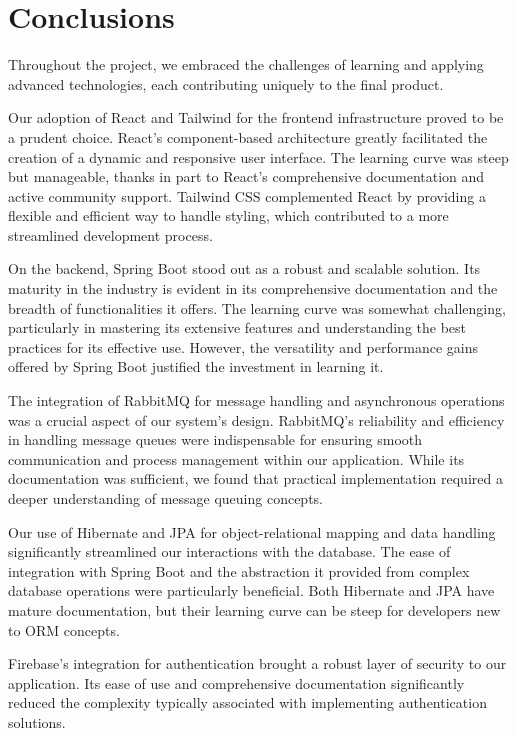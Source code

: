 \section{Conclusions}
\label{sec:conclusion}

Throughout the project, we embraced the challenges of learning and applying advanced technologies, each contributing uniquely to the final product.

Our adoption of React and Tailwind for the frontend infrastructure proved to be a prudent choice. React's component-based architecture greatly facilitated the creation of a dynamic and responsive user interface. The learning curve was steep but manageable, thanks in part to React's comprehensive documentation and active community support. Tailwind CSS complemented React by providing a flexible and efficient way to handle styling, which contributed to a more streamlined development process.

On the backend, Spring Boot \cite{springboot2023} stood out as a robust and scalable solution. Its maturity in the industry is evident in its comprehensive documentation and the breadth of functionalities it offers. The learning curve was somewhat challenging, particularly in mastering its extensive features and understanding the best practices for its effective use. However, the versatility and performance gains offered by Spring Boot justified the investment in learning it.

The integration of RabbitMQ \cite{rabbitmq2023} for message handling and asynchronous operations was a crucial aspect of our system's design. RabbitMQ's reliability and efficiency in handling message queues were indispensable for ensuring smooth communication and process management within our application. While its documentation was sufficient, we found that practical implementation required a deeper understanding of message queuing concepts.

Our use of Hibernate \cite{hibernate2023} and JPA for object-relational mapping and data handling significantly streamlined our interactions with the database. The ease of integration with Spring Boot and the abstraction it provided from complex database operations were particularly beneficial. Both Hibernate and JPA have mature documentation, but their learning curve can be steep for developers new to ORM concepts.

Firebase's \cite{firebase2023} integration for authentication brought a robust layer of security to our application. Its ease of use and comprehensive documentation significantly reduced the complexity typically associated with implementing authentication solutions.


